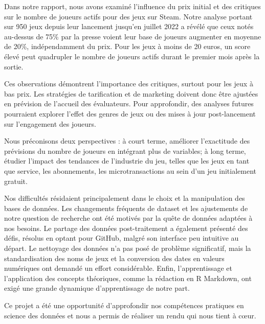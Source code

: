 \documentclass[mstat,12pt]{unswthesis}
\begin{document}
Dans notre rapport, nous avons examiné l'influence du prix initial et
des critiques sur le nombre de joueurs actifs pour des jeux sur Steam.
Notre analyse portant sur 950 jeux depuis leur lancement jusqu'en
juillet 2022 a révélé que ceux notés au-dessus de 75\% par la presse
voient leur base de joueurs augmenter en moyenne de 20\%, indépendamment
du prix. Pour les jeux à moins de 20 euros, un score élevé peut
quadrupler le nombre de joueurs actifs durant le premier mois après la
sortie.

Ces observations démontrent l'importance des critiques, surtout pour les
jeux à bas prix. Les stratégies de tarification et de marketing doivent
donc être ajustées en prévision de l'accueil des évaluateurs. Pour
approfondir, des analyses futures pourraient explorer l'effet des genres
de jeux ou des mises à jour post-lancement sur l'engagement des joueurs.

Nous préconisons deux perspectives : à court terme, améliorer
l'exactitude des prévisions du nombre de joueurs en intégrant plus de
variables; à long terme, étudier l'impact des tendances de l'industrie
du jeu, telles que les jeux en tant que service, les abonnements, les
microtransactions au sein d'un jeu initialement gratuit.

Nos difficultés résidaient principalement dans le choix et la
manipulation des bases de données. Les changements fréquents de dataset
et les ajustements de notre question de recherche ont été motivés par la
quête de données adaptées à nos besoins. Le partage des données
post-traitement a également présenté des défis, résolus en optant pour
GitHub, malgré son interface peu intuitive au départ. Le nettoyage des
données n'a pas posé de problème significatif, mais la standardisation
des noms de jeux et la conversion des dates en valeurs numériques ont
demandé un effort considérable. Enfin, l'apprentissage et l'application
des concepts théoriques, comme la rédaction en R Markdown, ont exigé une
grande dynamique d'apprentissage de notre part.

Ce projet a été une opportunité d'approfondir nos compétences pratiques
en science des données et nous a permis de réaliser un rendu qui nous
tient à cœur.



\afterpreface





%
%
\end{document}
